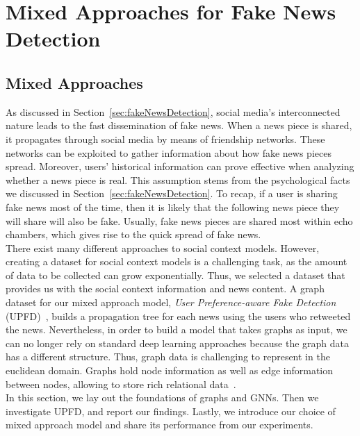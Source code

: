 
\chapter{Mixed Approaches for Fake News Detection}\label{chapter:MixedApproachesForFND}

\section{Mixed Approaches}
\label{sec:mixedApproaches}
As discussed in Section~\ref{sec:fakeNewsDetection}, social media's interconnected nature leads to the fast dissemination of
fake news. When a news piece is shared, it propagates through social media by means of friendship networks. These networks
can be exploited to gather information about how fake news pieces spread. Moreover, users' historical information can prove effective when analyzing whether a news piece is real. This assumption stems from the psychological facts we discussed in Section~\ref{sec:fakeNewsDetection}. To recap, if a user is sharing fake news most of the time, then it is likely that the following news piece they will share will also be fake. Usually, fake news pieces are shared most within echo chambers, which gives rise to the quick spread of fake news.\\
There exist many different approaches to social context models. However, creating a dataset for social context models is a challenging task, as the amount of data to be collected can grow exponentially. Thus, we selected a dataset that provides us with the social context information and news content. A graph dataset for our mixed approach model, \emph{User Preference-aware Fake Detection} (UPFD)~\parencite{UPFD_Dataset_Shu}, builds a propagation tree for each news using the users who retweeted the news. Nevertheless, in order to build a model that takes graphs as input, we can no longer rely on standard deep learning approaches because the graph data has a different structure. Thus, graph data is challenging to represent in the euclidean domain. Graphs hold node information as well as edge information between nodes, allowing to store rich relational data~\parencite{DeepLearningOnGraphs_Zhang}.\\
In this section, we lay out the foundations of graphs and GNNs. Then we investigate UPFD, and report our findings. Lastly, we introduce our choice of mixed approach model and share its performance from our experiments.

